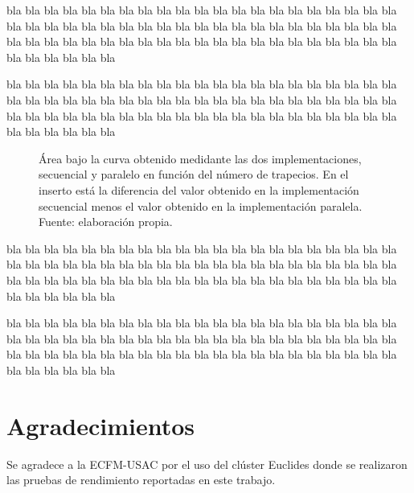 bla bla bla bla bla bla bla bla bla bla bla bla bla bla bla bla bla bla bla
bla bla bla bla bla bla bla bla bla bla bla bla bla bla bla bla bla bla bla
bla bla bla bla bla bla bla bla bla bla bla bla bla bla bla bla bla bla bla
bla bla bla bla bla bla bla bla bla bla bla bla

bla bla bla bla bla bla bla bla bla bla bla bla bla bla bla bla bla bla bla
bla bla bla bla bla bla bla bla bla bla bla bla bla bla bla bla bla bla bla
bla bla bla bla bla bla bla bla bla bla bla bla bla bla bla bla bla bla bla
bla bla bla bla bla bla bla bla bla bla bla bla

\begin{figure}
  \centering
  \caption{Área bajo la curva obtenido medidante las dos implementaciones,
    secuencial y paralelo en función del número de trapecios.  En el inserto
    está la diferencia del valor obtenido en la implementación secuencial
    menos el valor obtenido en la implementación paralela.  Fuente:
    elaboración propia.}
  \label{fig:Merror}
\end{figure}


bla bla bla bla bla bla bla bla bla bla bla bla bla bla bla bla bla bla bla
bla bla bla bla bla bla bla bla bla bla bla bla bla bla bla bla bla bla bla
bla bla bla bla bla bla bla bla bla bla bla bla bla bla bla bla bla bla bla
bla bla bla bla bla bla bla bla bla bla bla bla

bla bla bla bla bla bla bla bla bla bla bla bla bla bla bla bla bla bla bla
bla bla bla bla bla bla bla bla bla bla bla bla bla bla bla bla bla bla bla
bla bla bla bla bla bla bla bla bla bla bla bla bla bla bla bla bla bla bla
bla bla bla bla bla bla bla bla bla bla bla bla

\section*{Agradecimientos}
\label{sec:agradecimientos}

Se agradece a la ECFM-USAC por el uso del clúster Euclides donde se realizaron
las pruebas de rendimiento reportadas en este trabajo.

\nocite{*}
%
%




